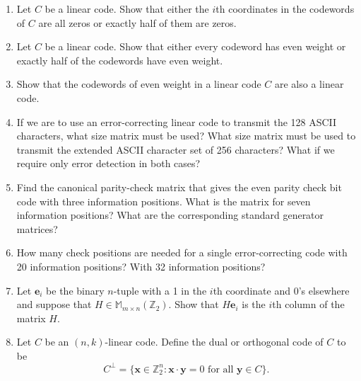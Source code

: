 {\begin{enumerate}
\begin{enumerate}
\end{enumerate}
In other words, a metric is simply a generalization of the notion of
distance. Prove that Hamming distance is a metric on ${\mathbb Z}_2^n$.
Decoding a message actually reduces to deciding which is the closest
codeword in terms of distance.
 
 
\item
Let $C$ be a linear code. Show that either the $i$th coordinates in the
codewords of $C$ are all zeros or exactly half of them are zeros. 
 
 
\item
Let $C$ be a linear code. Show that either every codeword has even
weight or exactly half of the codewords have even weight.
 
 
\item
Show that the codewords of even weight in a linear code $C$ are also a
linear code. 
 
 
 
 
\item
If we are to use an error-correcting linear code to transmit the 128
ASCII characters, what size matrix must be used? What size matrix must
be used to transmit the extended ASCII character set of 256
characters?  What if we require only error detection in both cases?
 
 
\item
Find the canonical parity-check matrix that gives the even
parity check bit code with three information positions. What is the
matrix for seven information positions?  What are the corresponding
standard generator matrices? 
 
 
\item
How many check positions are needed for a single error-correcting code
with 20 information positions? With 32 information positions?
 
 
 
\item
Let ${\mathbf e}_i$ be the binary $n$-tuple with a 1 in the $i$th
coordinate and $0$'s elsewhere and suppose that $H \in {\mathbb M}_{m
\times n}({\mathbb Z}_2)$. Show that $H{\mathbf e}_i$ is the $i$th
column of the matrix $H$. 
 
 
\item
Let $C$ be an $(n,k)$-linear code. Define the {\bfi
dual\/} or {\bfi orthogonal code\/} of $C$  to be 
\[
C^\perp = \{ {\mathbf x} \in {\mathbb Z}_2^n :  {\mathbf x} \cdot {\mathbf y} =
0 \mbox{ for all } {\mathbf y} \in C \}. 
\]
\begin{enumerate}
 

\end{enumerate}
\end{enumerate}}

